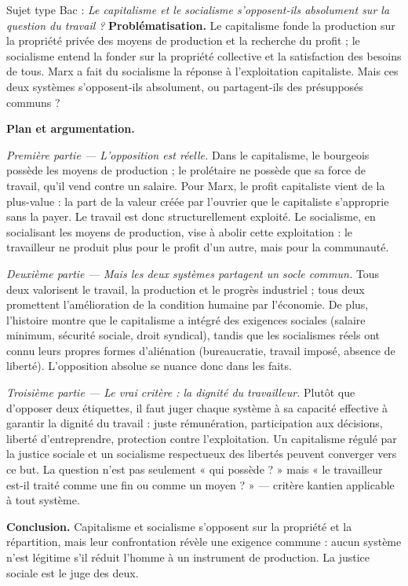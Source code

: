 \documentclass[11pt]{article}
\newcommand{\cle}[1]{{\popxbold\color{popdark}#1}}
\begin{document}
\begin{exoresolu}
Sujet type Bac : \emph{Le capitalisme et le socialisme s'opposent-ils absolument sur la question du travail ?}
\tcblower
\textbf{Problématisation.} Le capitalisme fonde la production sur la propriété privée des moyens de production et la recherche du profit ; le socialisme entend la fonder sur la propriété collective et la satisfaction des besoins de tous. Marx a fait du socialisme la réponse à l'exploitation capitaliste. Mais ces deux systèmes s'opposent-ils absolument, ou partagent-ils des présupposés communs ?

\textbf{Plan et argumentation.}

\emph{Première partie — L'opposition est réelle.} Dans le capitalisme, le \cle{bourgeois} possède les moyens de production ; le \cle{prolétaire} ne possède que sa force de travail, qu'il vend contre un salaire. Pour Marx, le profit capitaliste vient de la \cle{plus-value} : la part de la valeur créée par l'ouvrier que le capitaliste s'approprie sans la payer. Le travail est donc structurellement exploité. Le socialisme, en socialisant les moyens de production, vise à abolir cette exploitation : le travailleur ne produit plus pour le profit d'un autre, mais pour la communauté.

\emph{Deuxième partie — Mais les deux systèmes partagent un socle commun.} Tous deux valorisent le travail, la production et le progrès industriel ; tous deux promettent l'amélioration de la condition humaine par l'économie. De plus, l'histoire montre que le capitalisme a intégré des exigences sociales (salaire minimum, sécurité sociale, droit syndical), tandis que les socialismes réels ont connu leurs propres formes d'aliénation (bureaucratie, travail imposé, absence de liberté). L'opposition absolue se nuance donc dans les faits.

\emph{Troisième partie — Le vrai critère : la dignité du travailleur.} Plutôt que d'opposer deux étiquettes, il faut juger chaque système à sa capacité effective à garantir la dignité du travail : juste rémunération, participation aux décisions, liberté d'entreprendre, protection contre l'exploitation. Un capitalisme régulé par la justice sociale et un socialisme respectueux des libertés peuvent converger vers ce but. La question n'est pas seulement « qui possède ? » mais « le travailleur est-il traité comme une fin ou comme un moyen ? » — critère kantien applicable à tout système.

\textbf{Conclusion.} Capitalisme et socialisme s'opposent sur la propriété et la répartition, mais leur confrontation révèle une exigence commune : aucun système n'est légitime s'il réduit l'homme à un instrument de production. La justice sociale est le juge des deux.
\end{exoresolu}
\end{document}
